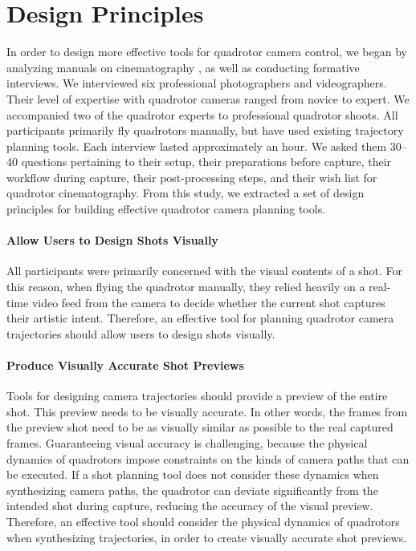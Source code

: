 \section{Design Principles}
\label{sec:ch2:design}

In order to design more effective tools for quadrotor camera control, we began by analyzing manuals on cinematography \cite{arijon:1976,katz:1991,mascelli:1965}, as well as conducting formative interviews. 
We interviewed six professional photographers and videographers.
Their level of expertise with quadrotor cameras ranged from novice to expert.
We accompanied two of the quadrotor experts to professional quadrotor shoots.
All participants primarily fly quadrotors manually, but have used existing trajectory planning tools.
Each interview lasted approximately an hour.
We asked them 30--40 questions pertaining to their setup, their preparations before capture, their workflow during capture, their post-processing steps, and their wish list for quadrotor cinematography.
From this study, we extracted a set of design principles for building effective quadrotor camera planning tools.   

\paragraph{Allow Users to Design Shots Visually}
All participants were primarily concerned with the visual contents of a shot.
For this reason, when flying the quadrotor manually, they relied heavily on a real-time video feed from the camera to decide whether the current shot captures their artistic intent.
Therefore, an effective tool for planning quadrotor camera trajectories should allow users to design shots visually. 

\paragraph{Produce Visually Accurate Shot Previews}
Tools for designing camera trajectories should provide a preview of the entire shot.
This preview needs to be visually accurate. In other words, the frames from the preview shot need to be as visually similar as possible to the real captured frames.
Guaranteeing visual accuracy is challenging, because the physical dynamics of quadrotors impose constraints on the kinds of camera paths that can be executed.
If a shot planning tool does not consider these dynamics when synthesizing camera paths, the quadrotor can deviate significantly from the intended shot during capture, reducing the accuracy of the visual preview.
Therefore, an effective tool should consider the physical dynamics of quadrotors when synthesizing trajectories, in order to create visually accurate shot previews. 

